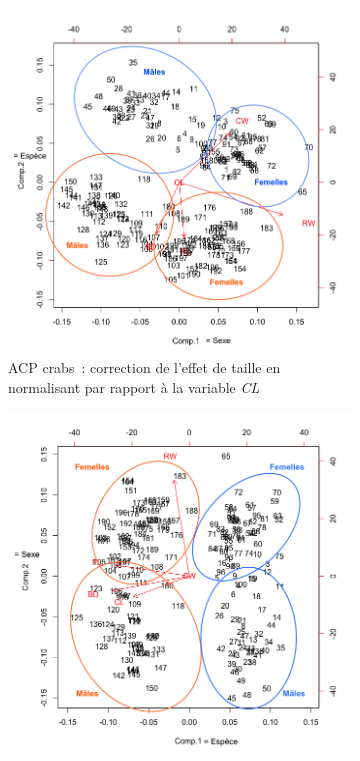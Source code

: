 \documentclass[a4paper,11pt]{report}
\begin{document}
\begin{figure}[H]
	\centering
	\captionsetup{justification=centering, margin=2cm}
	\begin{subfigure}[b]{0.5\linewidth}
		\centering
		\captionsetup{justification=centering, margin=1cm}
		\includegraphics[width=1\columnwidth]{img/2-3-2-biplot-acp-crabs-corrected-CL}
		\caption{\scriptsize ACP crabs~: correction de l'effet de taille en normalisant par rapport à la variable \textit{CL}}
		\label{fig:biplot_acp_crabs_corrected_CL}
	\end{subfigure}%
	\begin{subfigure}[b]{0.5\linewidth}
		\centering
		\captionsetup{justification=centering, margin=1cm}
		\includegraphics[width=1\columnwidth]{img/2-3-2-biplot-acp-crabs-corrected-CW}

\end{subfigure}
\end{figure}
\end{document}
